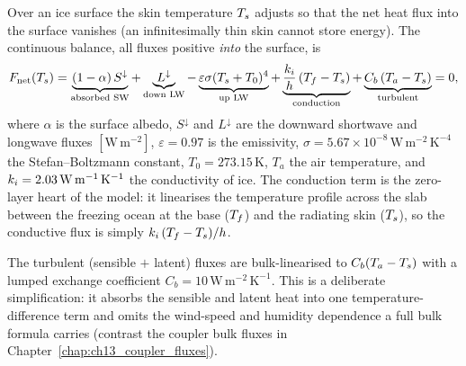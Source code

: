 Over an ice surface the skin temperature $T_{s}$ adjusts so that the net heat
flux into the surface vanishes (an infinitesimally thin skin cannot store
energy). The continuous balance, all fluxes positive \emph{into} the surface,
is
\begin{equation}
  F_{\mathrm{net}}(T_{s}) =
    \underbrace{(1-\alpha)\,S^{\downarrow}}_{\text{absorbed SW}}
    + \underbrace{L^{\downarrow}}_{\text{down LW}}
    - \underbrace{\varepsilon\sigma (T_{s}+T_0)^4}_{\text{up LW}}
    + \underbrace{\frac{k_{i}}{h}\,(T_{f} - T_{s})}_{\text{conduction}}
    + \underbrace{C_b\,(T_a - T_{s})}_{\text{turbulent}}
  = 0,
  \label{eq:ebalance}
\end{equation}
where $\alpha$ is the surface albedo, $S^{\downarrow}$ and $L^{\downarrow}$ are
the downward shortwave and longwave fluxes $[\mathrm{W\,m^{-2}}]$,
$\varepsilon=0.97$ is the emissivity, $\sigma=5.67\times10^{-8}\,
\mathrm{W\,m^{-2}\,K^{-4}}$ the Stefan--Boltzmann constant,
$T_0=273.15\,\mathrm{K}$, $T_a$ the air temperature, and $k_{i}=2.03\,
\mathrm{W\,m^{-1}\,K^{-1}}$ the conductivity of ice. The conduction term is the
zero-layer heart of the model: it linearises the temperature profile across the
slab between the freezing ocean at the base ($T_{f}$) and the radiating skin
($T_{s}$), so the conductive flux is simply $k_{i}\,(T_{f}-T_{s})/h$.

The turbulent (sensible $+$ latent) fluxes are bulk-linearised to
$C_b(T_a-T_{s})$ with a lumped exchange coefficient $C_b = 10\,
\mathrm{W\,m^{-2}\,K^{-1}}$. This is a deliberate simplification: it absorbs the
sensible and latent heat into one temperature-difference term and omits the
wind-speed and humidity dependence a full bulk formula carries (contrast the
coupler bulk fluxes in Chapter~\ref{chap:ch13_coupler_fluxes}).

